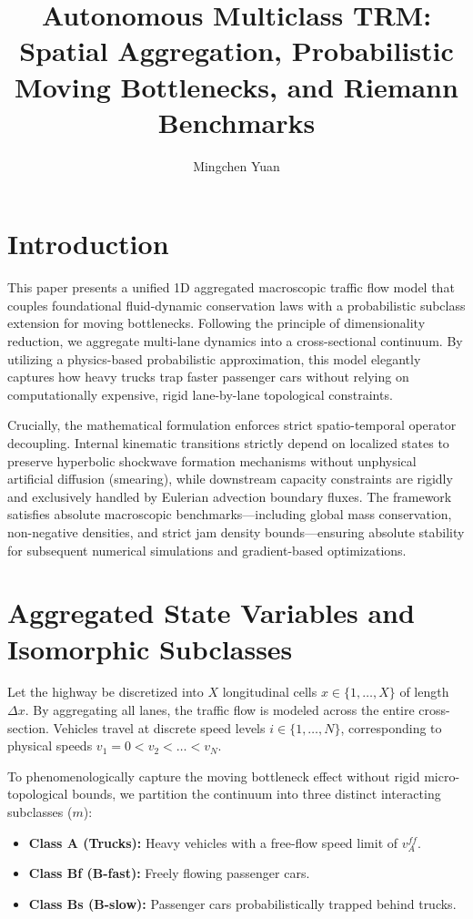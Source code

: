 \documentclass[11pt,a4paper]{article}
\begin{document}
\title{Autonomous Multiclass TRM: Spatial Aggregation, Probabilistic Moving Bottlenecks, and Riemann Benchmarks}
\author{Mingchen Yuan}
\date{}
\maketitle

\section{Introduction}
This paper presents a unified 1D aggregated macroscopic traffic flow model that couples foundational fluid-dynamic conservation laws with a probabilistic subclass extension for moving bottlenecks. Following the principle of dimensionality reduction, we aggregate multi-lane dynamics into a cross-sectional continuum. By utilizing a physics-based probabilistic approximation, this model elegantly captures how heavy trucks trap faster passenger cars without relying on computationally expensive, rigid lane-by-lane topological constraints.

Crucially, the mathematical formulation enforces strict spatio-temporal operator decoupling. Internal kinematic transitions strictly depend on localized states to preserve hyperbolic shockwave formation mechanisms without unphysical artificial diffusion (smearing), while downstream capacity constraints are rigidly and exclusively handled by Eulerian advection boundary fluxes. The framework satisfies absolute macroscopic benchmarks---including global mass conservation, non-negative densities, and strict jam density bounds---ensuring absolute stability for subsequent numerical simulations and gradient-based optimizations.

\section{Aggregated State Variables and Isomorphic Subclasses}
Let the highway be discretized into $X$ longitudinal cells $x\in\{1, \dots, X\}$ of length $\Delta x$. By aggregating all lanes, the traffic flow is modeled across the entire cross-section. Vehicles travel at discrete speed levels $i \in \{1, \dots, N\}$, corresponding to physical speeds $v_1 = 0 < v_2 < \dots < v_N$.

To phenomenologically capture the moving bottleneck effect without rigid micro-topological bounds, we partition the continuum into three distinct interacting subclasses ($m$):
\begin{itemize}
    \item \textbf{Class A (Trucks):} Heavy vehicles with a free-flow speed limit of $v_A^{ff}$.
    \item \textbf{Class Bf (B-fast):} Freely flowing passenger cars.
    \item \textbf{Class Bs (B-slow):} Passenger cars probabilistically trapped behind trucks.
\end{itemize}
\end{document}
